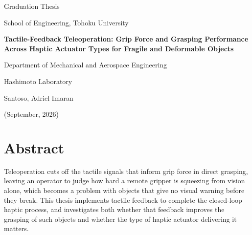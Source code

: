 \documentclass[12pt, a4paper, twoside, openright]{report}
\newcommand{\thesistitle}{Tactile-Feedback Teleoperation: Grip Force and Grasping Performance Across Haptic Actuator Types for Fragile and Deformable Objects}
\newcommand{\authorname}{Santoso, Adriel Imaran}
\newcommand{\labname}{Hashimoto Laboratory}
\newcommand{\graduationdate}{September, 2026}
\begin{document}
\begin{titlepage}
    \centering
    \thispagestyle{empty}
    \singlespacing

    \vspace*{25mm}

    {\fontsize{18}{22}\selectfont Graduation Thesis\par}
    \vspace{6mm}
    {\fontsize{18}{22}\selectfont School of Engineering, Tohoku University\par}

    \vspace{40mm}

    {\fontsize{20}{26}\selectfont\bfseries \thesistitle \par}

    \vspace{40mm}

    {\fontsize{18}{22}\selectfont Department of Mechanical and Aerospace Engineering\par}
    \vspace{4mm}
    {\fontsize{18}{22}\selectfont \labname\par}

    \vspace{20mm}

    {\fontsize{18}{22}\selectfont \authorname\par}

    \vfill

    {\fontsize{18}{22}\selectfont (\graduationdate)\par}

    \vspace*{20mm}
\end{titlepage}

\cleardoublepage

\setcounter{page}{1}

\chapter*{Abstract}

Teleoperation cuts off the tactile signals that inform grip force in direct
grasping, leaving an operator to judge how hard a remote gripper is squeezing
from vision alone, which becomes a problem with objects that give no visual
warning before they break. This thesis implements tactile feedback to complete
the closed-loop haptic process, and investigates both whether that feedback
improves the grasping of such objects and whether the type of haptic actuator
delivering it matters.
\end{document}
